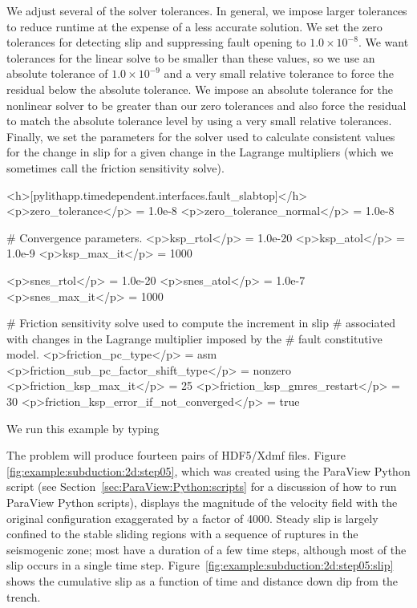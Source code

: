 We adjust several of the solver tolerances. In general, we impose
larger tolerances to reduce runtime at the expense of a less accurate
solution. We set the zero tolerances for detecting slip and
suppressing fault opening to $1.0 \times 10^{-8}$. We want tolerances
for the linear solve to be smaller than these values, so we use an
absolute tolerance of $1.0 \times 10^{-9}$ and a very small relative
tolerance to force the residual below the absolute tolerance. We
impose an absolute tolerance for the nonlinear solver to be greater
than our zero tolerances and also force the residual to match the
absolute tolerance level by using a very small relative
tolerances. Finally, we set the parameters for the solver used to
calculate consistent values for the change in slip for a given change
in the Lagrange multipliers (which we sometimes call the friction
sensitivity solve).
\begin{cfg}
<h>[pylithapp.timedependent.interfaces.fault_slabtop]</h>
<p>zero_tolerance</p> = 1.0e-8
<p>zero_tolerance_normal</p> = 1.0e-8

# Convergence parameters.
<p>ksp_rtol</p> = 1.0e-20
<p>ksp_atol</p> = 1.0e-9
<p>ksp_max_it</p> = 1000

<p>snes_rtol</p> = 1.0e-20
<p>snes_atol</p> = 1.0e-7
<p>snes_max_it</p> = 1000

# Friction sensitivity solve used to compute the increment in slip
# associated with changes in the Lagrange multiplier imposed by the
# fault constitutive model.
<p>friction_pc_type</p> = asm
<p>friction_sub_pc_factor_shift_type</p> = nonzero
<p>friction_ksp_max_it</p> = 25
<p>friction_ksp_gmres_restart</p> = 30
<p>friction_ksp_error_if_not_converged</p> = true
\end{cfg}

We run this example by typing
The problem will produce fourteen pairs of HDF5/Xdmf files. Figure
\vref{fig:example:subduction:2d:step05}, which was created using the
ParaView Python script  (see
Section~\vref{sec:ParaView:Python:scripts} for a discussion of how to
run ParaView Python scripts), displays the magnitude of the velocity
field with the original configuration exaggerated by a factor of
4000. Steady slip is largely confined to the stable sliding regions
with a sequence of ruptures in the seismogenic zone; most have a
duration of a few time steps, although most of the slip occurs in a
single time step. Figure~\ref{fig:example:subduction:2d:step05:slip}
shows the cumulative slip as a function of time and distance down dip
from the trench.

